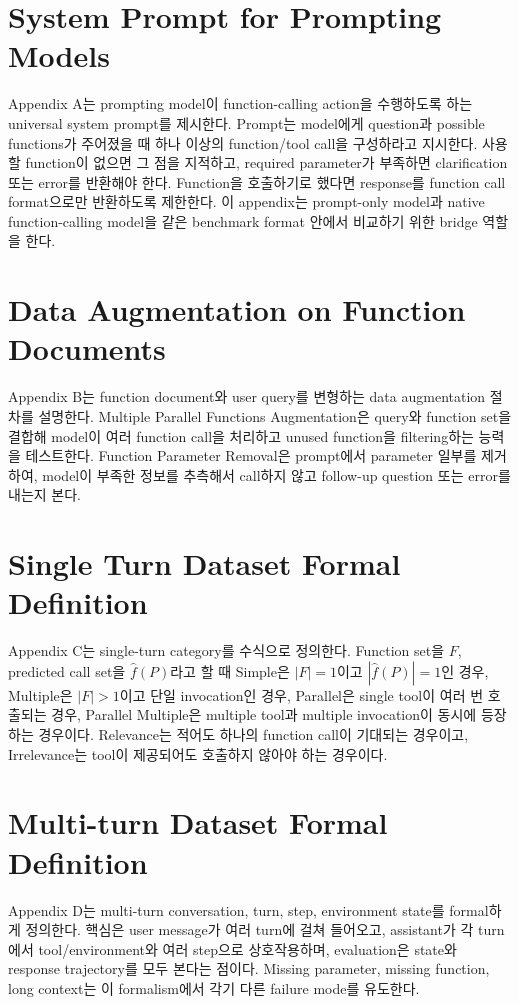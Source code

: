 \documentclass[11pt]{article}
\begin{document}
\appendix
\section{System Prompt for Prompting Models}
Appendix A는 prompting model이 function-calling action을 수행하도록 하는 universal system prompt를 제시한다. Prompt는 model에게 question과 possible functions가 주어졌을 때 하나 이상의 function/tool call을 구성하라고 지시한다. 사용할 function이 없으면 그 점을 지적하고, required parameter가 부족하면 clarification 또는 error를 반환해야 한다. Function을 호출하기로 했다면 response를 function call format으로만 반환하도록 제한한다. 이 appendix는 prompt-only model과 native function-calling model을 같은 benchmark format 안에서 비교하기 위한 bridge 역할을 한다.

\section{Data Augmentation on Function Documents}
Appendix B는 function document와 user query를 변형하는 data augmentation 절차를 설명한다. Multiple Parallel Functions Augmentation은 query와 function set을 결합해 model이 여러 function call을 처리하고 unused function을 filtering하는 능력을 테스트한다. Function Parameter Removal은 prompt에서 parameter 일부를 제거하여, model이 부족한 정보를 추측해서 call하지 않고 follow-up question 또는 error를 내는지 본다.

\section{Single Turn Dataset Formal Definition}
Appendix C는 single-turn category를 수식으로 정의한다. Function set을 $F$, predicted call set을 $\hat{f}(P)$라고 할 때 Simple은 $|F|=1$이고 $|\hat{f}(P)|=1$인 경우, Multiple은 $|F|>1$이고 단일 invocation인 경우, Parallel은 single tool이 여러 번 호출되는 경우, Parallel Multiple은 multiple tool과 multiple invocation이 동시에 등장하는 경우이다. Relevance는 적어도 하나의 function call이 기대되는 경우이고, Irrelevance는 tool이 제공되어도 호출하지 않아야 하는 경우이다.

\section{Multi-turn Dataset Formal Definition}
Appendix D는 multi-turn conversation, turn, step, environment state를 formal하게 정의한다. 핵심은 user message가 여러 turn에 걸쳐 들어오고, assistant가 각 turn에서 tool/environment와 여러 step으로 상호작용하며, evaluation은 state와 response trajectory를 모두 본다는 점이다. Missing parameter, missing function, long context는 이 formalism에서 각기 다른 failure mode를 유도한다.
\end{document}
